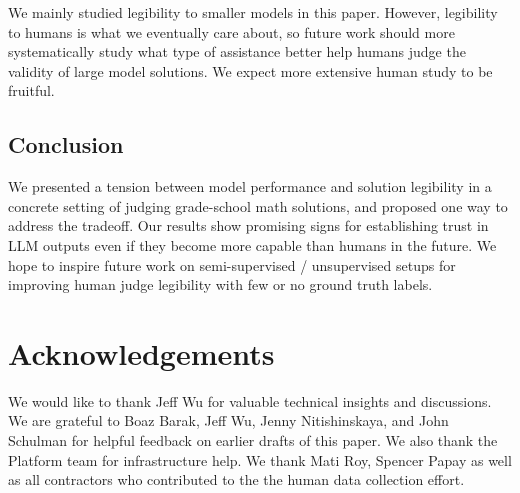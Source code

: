 \documentclass{article}
\begin{document}
We mainly studied legibility to smaller models in this paper. However, legibility to humans is what we eventually care about, so future work should more systematically study what type of assistance better help humans judge the validity of large model solutions. We expect more extensive human study to be fruitful.

\subsection{Conclusion}
We presented a tension between model performance and solution legibility in a concrete setting of judging grade-school math solutions, and proposed one way to address the tradeoff. Our results show promising signs for establishing trust in LLM outputs even if they become more capable than humans in the future. We hope to inspire future work on semi-supervised / unsupervised setups for improving human judge legibility with few or no ground truth labels.

\section{Acknowledgements}
We would like to thank Jeff Wu for valuable technical insights and discussions. We are grateful to Boaz Barak, Jeff Wu, Jenny Nitishinskaya, and John Schulman for helpful feedback on earlier drafts of this paper. We also thank the Platform team for infrastructure help. We thank Mati Roy, Spencer Papay as well as all contractors who contributed to the the human data collection effort.


\newpage
\appendix

\setcounter{figure}{0}
\renewcommand{\thefigure}{S\arabic{figure}}
\renewcommand{\figurename}{Supplementary Figure}

\iffalse
\end{document}
